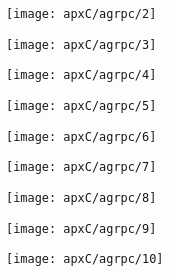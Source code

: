 \begin{figure}[H]
\centering

\texttt{[image: apxC/agrpc/2]}

\end{figure}
\begin{figure}[H]
\centering

\texttt{[image: apxC/agrpc/3]}

\end{figure}
\begin{figure}[H]
\centering

\texttt{[image: apxC/agrpc/4]}

\end{figure}
\begin{figure}[H]
\centering

\texttt{[image: apxC/agrpc/5]}

\end{figure}
\begin{figure}[H]
\centering

\texttt{[image: apxC/agrpc/6]}

\end{figure}
\begin{figure}[H]
\centering

\texttt{[image: apxC/agrpc/7]}

\end{figure}
\begin{figure}[H]
\centering

\texttt{[image: apxC/agrpc/8]}

\end{figure}
\begin{figure}[H]
\centering

\texttt{[image: apxC/agrpc/9]}

\end{figure}
\begin{figure}[H]
\centering

\texttt{[image: apxC/agrpc/10]}

\end{figure}